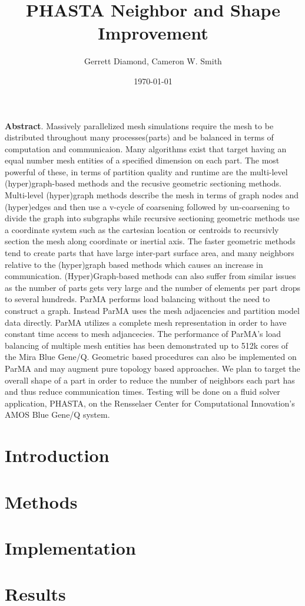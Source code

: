\documentclass[a4paper]{article}
\title{PHASTA Neighbor and Shape Improvement}
\author{Gerrett Diamond, Cameron W. Smith}
\date{\today}
\begin{document}
\maketitle

\textbf{Abstract}. 
Massively parallelized mesh simulations require the mesh to be distributed
throughout many processes(parts) and be balanced in terms of computation and
communicaion. 
Many algorithms exist that target having an equal number mesh entities of a
specified dimension on each part. 
The most powerful of these, in terms of partition quality and runtime are the
multi-level (hyper)graph-based methods and the recusive geometric sectioning
methods. 
Multi-level (hyper)graph methods describe the mesh in terms of graph nodes and
(hyper)edges and then use a v-cycle of coarsening followed by un-coarsening to
divide the graph into subgraphs while recursive sectioning geometric methods use
a coordinate system such as the cartesian location or centroids to recursivly
section the mesh along coordinate or inertial axis. 
The faster geometric methods tend to create parts that have large inter-part
surface area, and many neighbors relative to the (hyper)graph based methods
which causes an increase in communication.
(Hyper)Graph-based methods can also suffer from similar issues as the number of
parts gets very large and the number of elements per part drops to several
hundreds. 
ParMA performs load balancing without the need to construct a
graph. 
Instead ParMA uses the mesh adjacencies and partition model data directly.
ParMA utilizes a complete mesh representation in order to have constant time 
access to mesh adjancecies.
The performance of ParMA's load balancing of multiple mesh entities has been 
demonstrated up to 512k cores of the Mira Blue Gene/Q.
Geometric based procedures can also be implemented on ParMA and may augment
 pure topology based approaches.
We plan to target the overall shape of a part in order to reduce the number of
neighbors each part has and thus reduce communication times.  
Testing will be done on a fluid solver application, PHASTA, on the Rensselaer
Center for Computational Innovation's AMOS Blue Gene/Q system.
 
\section{Introduction}

\section{Methods}


\section{Implementation}

\section{Results}

\newpage


\end{document}
